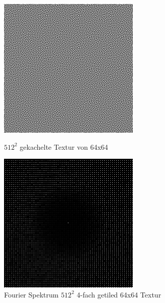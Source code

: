 \begin{figure}[H]\label{pic:tiled blue noise}
    \centering
    \begin{minipage}[t]{0.45\linewidth}
        \centering
        \includegraphics[width=\linewidth]{content/BlueNoise/Bilder/tiled4times.png}
        \caption{$512^{2}$ gekachelte Textur von 64x64}
    \end{minipage}
    \hfill
    \begin{minipage}[t]{0.45\linewidth}
        \centering
        \includegraphics[width=\linewidth]{content/BlueNoise/Bilder/FFTtiled4times.png}
        \caption{Fourier Spektrum $512^{2}$ 4-fach getiled 64x64 Textur}
    \end{minipage}
\end{figure}

